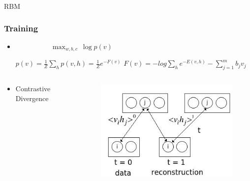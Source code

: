 \documentclass{beamer}
\begin{document}
\begin{section}{RBM}
\begin{frame}
\frametitle{Training}
\begin{itemize}
\item  $ \ \ \ \  \ \ \ \ \ \ \ \ \ \ \ \ \ \ \ \ \ \ \ \displaystyle\max_{w,b,c} \ \log p(v)$ 
\begin{center}
$p(v) =\frac{1}{Z} \sum_{h}p(v,h) =\frac{1}{Z} e^{-F(v)}$
$F(v) = -log\sum_{h}e^{-E(v,h)} -\sum_{j=1}^{m}b_{j}v_{j} $\newline
\end{center}
\end{itemize}
\begin{columns}
\begin{column}{6cm}
\begin{itemize}
\item Contrastive Divergence
\end{itemize}
\end{column}
\begin{column}{4cm}
\begin{figure}
\centering
\includegraphics[width=1\linewidth]{./img/cd}
\label{fig:cd}
\end{figure}
\end{column}
\end{columns}
\end{frame}
\end{section}
\end{document}
